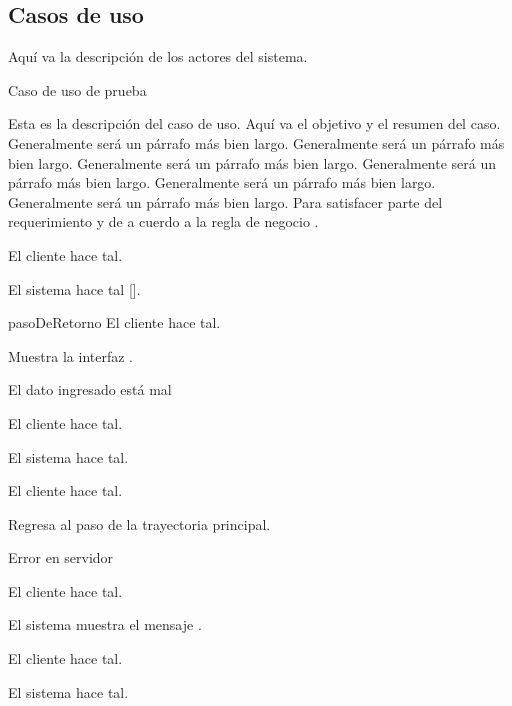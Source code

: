 %
%
%

\subsection{Casos de uso}

Aquí va la descripción de los actores del sistema.

\newpage
{}                       %
{Caso de uso de prueba}     %
{
  Esta es la descripción del caso de uso. Aquí va el objetivo y el resumen del
  caso. Generalmente será un párrafo más bien largo. Generalmente será un
  párrafo más bien largo. Generalmente será un párrafo más bien largo.
  Generalmente será un párrafo más bien largo. Generalmente será un párrafo más
  bien largo. Generalmente será un párrafo más bien largo. Para satisfacer parte
  del requerimiento  y de a cuerdo a la regla de
  negocio .

  \begin{trayectoriaPrincipal}
    \item El cliente hace tal.
    \item El sistema hace tal [].
    \item[pasoDeRetorno] El cliente hace tal.
    \item Muestra la interfaz .
  \end{trayectoriaPrincipal}

  \begin{trayectoriaAlternativa}[ta:errorEnTal]  %
    {El dato ingresado está mal}                 %
    \item El cliente hace tal.
    \item El sistema hace tal.
    \item El cliente hace tal.
    \item Regresa al paso  de la trayectoria
      principal.
  \end{trayectoriaAlternativa}

  \begin{trayectoriaAlternativa}[ta:errorEnTalDOS]
    {Error en servidor}
    \item El cliente hace tal.
    \item El sistema muestra el mensaje .
    \item El cliente hace tal.
    \item El sistema hace tal.
  \end{trayectoriaAlternativa}
}

